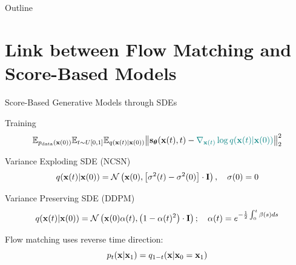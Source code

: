 \documentclass{beamer}
\renewcommand{\eqpause}{}
\begin{document}

\begin{frame}
\titlepage
	\resetonslide
\end{frame}









\begin{frame}{Outline}
	\tableofcontents
\end{frame}
\section{Link between Flow Matching and Score-Based Models}
\begin{frame}{Score-Based Generative Models through SDEs}
	\vspace{-0.3cm}
	\begin{block}{Training}
		\vspace{-0.7cm}
		\[
			\mathbb{E}_{p_{\text{data}}(\mathbf{x}(0))} \mathbb{E}_{t \sim U[0, 1]} \mathbb{E}_{q(\mathbf{x}(t) | \mathbf{x}(0))}\bigl\| \mathbf{s}_{\boldsymbol{\theta}}(\mathbf{x}(t), t) - {\color{teal}\nabla_{\mathbf{x}(t)} \log q(\mathbf{x}(t) | \mathbf{x}(0))} \bigr\|^2_2 
		\]
		\vspace{-0.5cm}
	\end{block}
	\eqpause
	\begin{block}{Variance Exploding SDE (NCSN)}
		\vspace{-0.3cm}
		\[
			q(\mathbf{x}(t) | \mathbf{x}(0)) = \mathcal{N}\left(\mathbf{x}(0), \left[\sigma^2(t) - \sigma^2(0)\right] \cdot \mathbf{I}\right), \quad \sigma(0) =0
		\]
		\vspace{-0.5cm}
	\end{block}
	\begin{block}{Variance Preserving SDE (DDPM)}
		\vspace{-0.5cm}
		\[
			q(\mathbf{x}(t) | \mathbf{x}(0)) = \mathcal{N}\left(\mathbf{x}(0) \alpha(t), \left(1 - \alpha(t)^2\right) \cdot \mathbf{I}\right); \quad \alpha(t) = e^{-\frac{1}{2} \int_0^t \beta(s) ds}
		\]
		\vspace{-0.5cm}
	\end{block}
	\eqpause
	Flow matching uses reverse time direction:
	\[
		p_t(\mathbf{x}| \mathbf{x}_1) = q_{1-t}(\mathbf{x}| \mathbf{x}_0=\mathbf{x}_1)
	\]
\end{frame}
\end{document}

